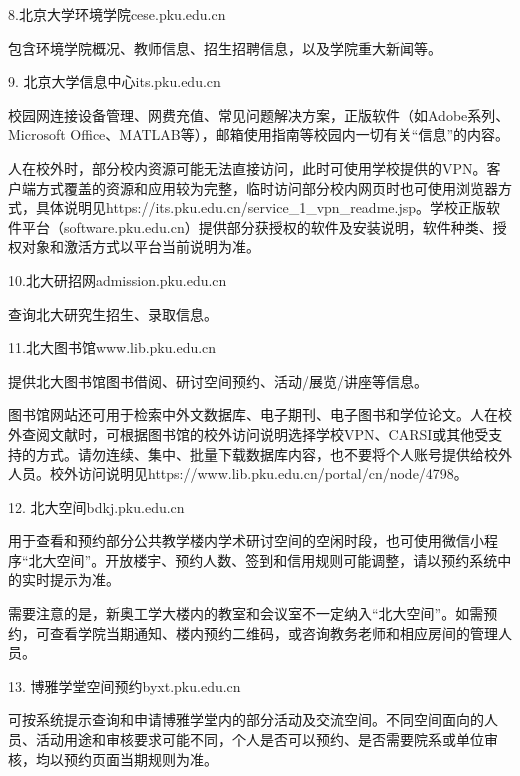\documentclass[11pt,oneside]{book}
\begin{document}
\vspace{10pt}

8.北京大学环境学院\quad cese.pku.edu.cn

包含环境学院概况、教师信息、招生招聘信息，以及学院重大新闻等。

\vspace{10pt}

9. 北京大学信息中心\quad its.pku.edu.cn

校园网连接设备管理、网费充值、常见问题解决方案，正版软件（如Adobe系列、Microsoft Office、MATLAB等），邮箱使用指南等校园内一切有关“信息”的内容。

人在校外时，部分校内资源可能无法直接访问，此时可使用学校提供的VPN。客户端方式覆盖的资源和应用较为完整，临时访问部分校内网页时也可使用浏览器方式，具体说明见https://its.pku.edu.cn/service\_1\_vpn\_readme.jsp。学校正版软件平台（software.pku.edu.cn）提供部分获授权的软件及安装说明，软件种类、授权对象和激活方式以平台当前说明为准。

\vspace{10pt}

10.北大研招网\quad admission.pku.edu.cn

查询北大研究生招生、录取信息。

\vspace{10pt}

11.北大图书馆\quad www.lib.pku.edu.cn

提供北大图书馆图书借阅、研讨空间预约、活动/展览/讲座等信息。

图书馆网站还可用于检索中外文数据库、电子期刊、电子图书和学位论文。人在校外查阅文献时，可根据图书馆的校外访问说明选择学校VPN、CARSI或其他受支持的方式。请勿连续、集中、批量下载数据库内容，也不要将个人账号提供给校外人员。校外访问说明见https://www.lib.pku.edu.cn/portal/cn/node/4798。

\vspace{10pt}

12. 北大空间\quad bdkj.pku.edu.cn

用于查看和预约部分公共教学楼内学术研讨空间的空闲时段，也可使用微信小程序“北大空间”。开放楼宇、预约人数、签到和信用规则可能调整，请以预约系统中的实时提示为准。

需要注意的是，新奥工学大楼内的教室和会议室不一定纳入“北大空间”。如需预约，可查看学院当期通知、楼内预约二维码，或咨询教务老师和相应房间的管理人员。

\vspace{10pt}

13. 博雅学堂空间预约\quad byxt.pku.edu.cn

可按系统提示查询和申请博雅学堂内的部分活动及交流空间。不同空间面向的人员、活动用途和审核要求可能不同，个人是否可以预约、是否需要院系或单位审核，均以预约页面当期规则为准。
\end{document}
